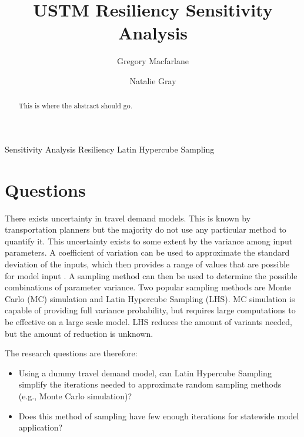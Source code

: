 \documentclass[3p, authoryear, review]{elsarticle} %
\providecommand{\tightlist}{%
  \setlength{\itemsep}{0pt}\setlength{\parskip}{0pt}}
\begin{document}
\begin{frontmatter}

  \title{USTM Resiliency Sensitivity Analysis}
    \author[Brigham Young University]{Gregory Macfarlane}
    \author[Brigham Young University]{Natalie Gray}
      \address[Brigham Young University]{Civil and Environmental Engineering Department, 430 Engineering Building, Provo, Utah 84602}
  
  \begin{abstract}
  This is where the abstract should go.
  \end{abstract}
   \begin{keyword} Sensitivity Analysis Resiliency Latin Hypercube Sampling\end{keyword}
 \end{frontmatter}

\hypertarget{questions}{%
\section{Questions}\label{questions}}

There exists uncertainty in travel demand models. This is known by transportation planners but the majority do not use any particular method to quantify it. This uncertainty exists to some extent by the variance among input parameters. A coefficient of variation can be used to approximate the standard deviation of the inputs, which then provides a range of values that are possible for model input \citep{zhao2002propagation}. A sampling method can then be used to determine the possible combinations of parameter variance. Two popular sampling methods are Monte Carlo (MC) simulation and Latin Hypercube Sampling (LHS). MC simulation is capable of providing full variance probability, but requires large computations to be effective on a large scale model. LHS reduces the amount of variants needed, but the amount of reduction is unknown. \citep{yang2013sensitivity}

The research questions are therefore:

\begin{itemize}
\tightlist
\item
  Using a dummy travel demand model, can Latin Hypercube Sampling simplify the iterations needed to approximate random sampling methods (e.g., Monte Carlo simulation)?
\item
  Does this method of sampling have few enough iterations for statewide model application?
\end{itemize}
\end{document}
